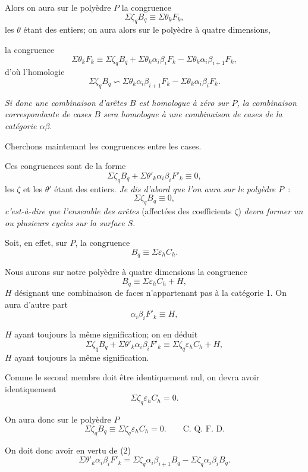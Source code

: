 \documentclass{article}
\begin{document}
Alors on aura sur le polyèdre $P$ la congruence
\[ \Sigma \zeta_{q} B_{q} \equiv \Sigma \theta_{k} F_{k}, \]
les $\theta$ étant des entiers; on aura alors sur le polyèdre à quatre dimensions,

la congruence
\[ \Sigma \theta_{k} F_{k} \equiv \Sigma \zeta_{q} B_{q} + \Sigma \theta_{k} \alpha_{i}\beta_{i}F_{k} - \Sigma \theta_{k} \alpha_{i}\beta_{i+1}F_{k}, \]
d'où l'homologie
\[ \Sigma \zeta_{q} B_{q} \backsim \Sigma \theta_{k} \alpha_{i}\beta_{i+1}F_{k} - \Sigma \theta_{k} \alpha_{i}\beta_{i}F_{k}. \]

\emph{Si donc une combinaison d'arêtes $B$ est homologue à zéro sur $P$, la combinaison correspondante de cases $B$ sera homologue à une combinaison de cases de la catégorie $\alpha\beta$}.

Cherchons maintenant les congruences entre les cases.

Ces congruences sont de la forme
\[ \Sigma \zeta_{q} B_{q} + \Sigma \theta'_{k} \alpha_{i}\beta_{i}F'_{k} \equiv 0, \tag{2} \]
les $\zeta$ et les $\theta'$ étant des entiers. \emph{Je dis d'abord que l'on aura sur le polyèdre $P$}~:
\[ \Sigma \zeta_{q} B_{q} \equiv 0, \]
\emph{c'est-à-dire que l'ensemble des arêtes} (affectées des coefficients $\zeta$) \emph{devra former un ou plusieurs cycles sur la surface $S$}.

Soit, en effet, sur $P$, la congruence
\[ B_{q} \equiv \Sigma \varepsilon_{h} C_{h}. \]

Nous aurons sur notre polyèdre à quatre dimensions la congruence
\[ B_{q} \equiv \Sigma \varepsilon_{h} C_{h} + H, \]
$H$ désignant une combinaison de faces n'appartenant pas à la catégorie 1. On aura d'autre part
\[ \alpha_{i}\beta_{i}F'_{k} \equiv H, \]

$H$ ayant toujours la même signification; on en déduit
\[ \Sigma \zeta_{q} B_{q} + \Sigma \theta'_{k} \alpha_{i}\beta_{i}F'_{k} \equiv \Sigma \zeta_{q} \varepsilon_{h} C_{h} + H, \]
$H$ ayant toujours la même signification.

Comme le second membre doit être identiquement nul, on devra avoir identiquement
\[ \Sigma \zeta_{q} \varepsilon_{h} C_{h} = 0. \]

On aura donc sur le polyèdre $P$
\[ \Sigma \zeta_{q} B_{q} \equiv \Sigma \zeta_{q} \varepsilon_{h} C_{h} = 0. \qquad \text{C.~Q.~F.~D.} \tag{3} \]

On doit donc avoir en vertu de (2)
\[ \Sigma \theta'_{k} \alpha_{i}\beta_{i}F'_{k} = \Sigma \zeta_{q} \alpha_{i}\beta_{i+1}B_{q} - \Sigma \zeta_{q} \alpha_{i}\beta_{i}B_{q}. \tag{4} \]
\end{document}

